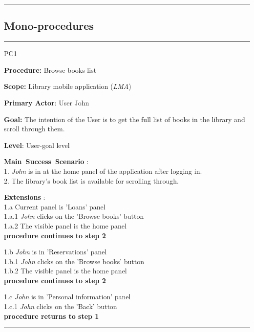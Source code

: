 \hrule



\subsection{Mono-procedures}

\vspace{0.5cm}
\hrule
\begin{lyxlist}{PC1}
\small{
\item [\textbf{Procedure:}] Browse books list
\item [\textbf{Scope:}] Library mobile application (\emph{LMA})
\item [\textbf{Primary Actor}:] User John
\item [\textbf{Goal:}] The intention of the User is to get the full list of
books in the library and scroll through them.
\item [\textbf{Level}:] User-goal level
\item [\textbf{Main~Success~Scenario}]:\\
1. \emph{John} is in at the home panel of the application after logging in.\\
2. The library's book list is available for scrolling through.\\


\item [\textbf{Extensions}]:\\
1.a Current panel is 'Loans' panel\\
\hspace*{0.5cm} 1.a.1 \emph{John} clicks on the 'Browse books' button\\
\hspace*{0.5cm} 1.a.2 The visible panel is the home panel\\
\hspace*{0.5cm} \textbf{procedure continues to step 2}

1.b \emph{John} is in 'Reservations' panel\\
\hspace*{0.5cm} 1.b.1 \emph{John} clicks on the 'Browse books' button\\
\hspace*{0.5cm} 1.b.2 The visible panel is the home panel\\
\hspace*{0.5cm} \textbf{procedure continues to step 2}

1.c \emph{John} is in 'Personal information' panel\\
\hspace*{0.5cm} 1.c.1 \emph{John} clicks on the 'Back' button\\
\hspace*{0.5cm} \textbf{procedure returns to step 1}

}


\end{lyxlist}
\hrule

